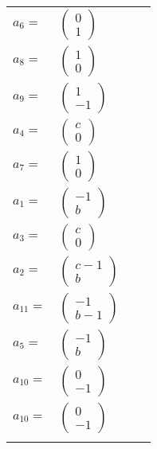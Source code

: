 \documentclass[1p]{elsarticle_modified}
\theoremstyle{definition}
\begin{document}
\begin{tabular}{m{7pt} m{180pt} m{7pt} m{180pt} }
\flushright $a_{6}=$&$\begin{pmatrix}0\\1\end{pmatrix}$ \\
\flushright $a_{8}=$&$\begin{pmatrix}1\\0\end{pmatrix}$ \\
\flushright $a_{9}=$&$\begin{pmatrix}1\\-1\end{pmatrix}$ \\
\flushright $a_{4}=$&$\begin{pmatrix}c\\0\end{pmatrix}$ \\
\flushright $a_{7}=$&$\begin{pmatrix}1\\0\end{pmatrix}$ \\
\flushright $a_{1}=$&$\begin{pmatrix}-1\\b\end{pmatrix}$ \\
\flushright $a_{3}=$&$\begin{pmatrix}c\\0\end{pmatrix}$ \\
\flushright $a_{2}=$&$\begin{pmatrix}c-1\\b\end{pmatrix}$ \\
\flushright $a_{11}=$&$\begin{pmatrix}-1\\b-1\end{pmatrix}$ \\
\flushright $a_{5}=$&$\begin{pmatrix}-1\\b\end{pmatrix}$ \\
\flushright $a_{10}=$&$\begin{pmatrix}0\\-1\end{pmatrix}$\\ \flushright $a_{10}=$&$\begin{pmatrix}0\\-1\end{pmatrix}$\\&\end{tabular}
\end{document}
